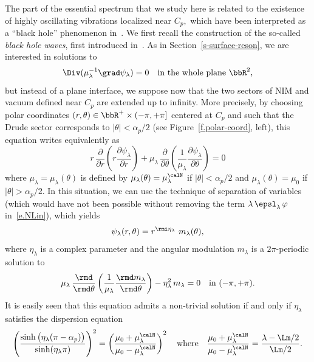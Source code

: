 The part of the essential spectrum that we study here is related to the existence of highly oscillating vibrations localized near $C_p,$ which have been interpreted as a ``black hole'' phenomenon in~\cite{Bon-etal-16}. We first recall the construction of the so-called \emph{black hole waves}, first introduced in~\cite{Bon-Dau-Ram-99}. As in Section~\ref{s-surface-reson}, we are interested in solutions to
\begin{equation}\label{e.eq-black-hole}
\Div(\mu_\lambda^{-1} \grad \psi_\lambda) = 0 \quad\text{in the whole plane }\bbR^2,
\end{equation}
but instead of a plane interface, we suppose now that the two sectors of NIM and vacuum defined near $C_p$ are extended up to infinity. More precisely, by choosing polar coordinates $(r, \theta) \in \bbR^+ \times (-\pi,+\pi]$ centered at $C_p$ and such that the Drude sector corresponds to $|\theta| < \alpha_p/2$ (see Figure~\ref{f.polar-coord}, left), this equation writes equivalently as
\[
r \, \frac{\partial}{\partial r} \left(r \frac{\partial \psi_\lambda}{\partial r} \right) + \mu_\lambda \, \frac{\partial }{\partial \theta} \left(\frac{1}{\mu_\lambda} \frac{\partial \psi_\lambda}{\partial \theta} \right) = 0
\]
where $\mu_\lambda = \mu_\lambda(\theta)$ is defined by $\mu_\lambda(\theta) = \mu_\lambda^\calN$ if $|\theta| < \alpha_p/2$ and $\mu_\lambda(\theta) = \mu_0$ if $|\theta| > \alpha_p/2$. In this situation, we can use the technique of separation of variables (which would have not been possible without removing the term $\lambda\,\epsl_\lambda\,\varphi$ in~\eqref{e.NLin}), which yields
\begin{equation}
\psi_\lambda(r,\theta) = r^{\rmi\eta_\lambda}\ m_\lambda(\theta),\label{e.def-psi-lambda}
\end{equation}
where $\eta_\lambda$ is a complex parameter and the angular modulation $m_\lambda$ is a $2\pi$-periodic solution to
\begin{equation}
\mu_\lambda \, \frac{\rmd}{\rmd \theta} \left(\frac{1}{\mu_\lambda} \frac{\rmd m_\lambda}{\rmd \theta} \right) - \eta_\lambda^2 \, m_\lambda = 0
\quad \text{in } (-\pi,+\pi).\label{e.ang-mod}
\end{equation}
It is easily seen that this equation admits a non-trivial solution if and only if $\eta_\lambda$ satisfies the dispersion equation
\begin{equation}\label{e.equa-disp}
\left(\frac{\sinh\big(\eta_\lambda(\pi-\alpha_p)\big)}{\sinh(\eta_\lambda\pi)} \right)^2 =
\left(\frac{\mu_0 + \mu_\lambda^\calN}{\mu_0 - \mu_\lambda^\calN} \right)^2
\quad\text{where}\quad
\frac{\mu_0 + \mu_\lambda^\calN}{\mu_0 - \mu_\lambda^\calN} = \frac{\lambda-\Lm/2}{\Lm/2}.
\end{equation}


